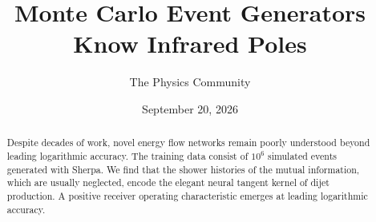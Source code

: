 \documentclass[11pt]{article}
\title{Monte Carlo Event Generators Know Infrared Poles}
\author{The Physics Community}
\date{September 20, 2026}
\numberwithin{equation}{section}
\theoremstyle{definition}
\theoremstyle{remark}
\begin{document}
\maketitle
\begin{abstract}
Despite decades of work, novel energy flow networks remain poorly
understood beyond leading logarithmic accuracy. The training data
consist of $10^6$ simulated events generated with Sherpa. We find that
the shower histories of the mutual information, which are usually
neglected, encode the elegant neural tangent kernel of dijet production.
A positive receiver operating characteristic emerges at leading
logarithmic accuracy.
\end{abstract}
\tableofcontents





\nocite{*}


\end{document}
